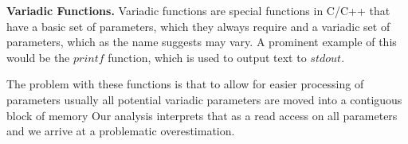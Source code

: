 %

\textbf{Variadic Functions.}
\label{subsection:variadicfunctions}
Variadic functions are special functions in C/C++ that have a basic set of parameters, 
which they always require and a variadic set of parameters, which as the name suggests 
may vary. A prominent example of this would be the $printf$ function, which is used 
to output text to $stdout$.

The problem with these functions is that to allow for easier processing of parameters
usually all potential variadic parameters are moved into a contiguous block of memory
Our analysis interprets that as a read access on all 
parameters and we arrive at a problematic overestimation. 

